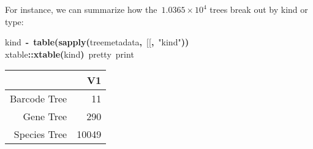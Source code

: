 \documentclass[authoryear, preprint]{elsarticle}
\makeatletter
\newcommand{\hlfunctioncall}[1]{\textcolor[rgb]{.5,0,.33}{\textbf{#1}}}%
\newcommand{\hlstring}[1]{\textcolor[rgb]{.6,.6,1}{#1}}%
\newcommand{\hlkeyword}[1]{\textbf{#1}}%
\newcommand{\hlcomment}[1]{\textcolor[rgb]{.18,.6,.34}{#1}}%
\newcommand{\hlassignement}[1]{\textbf{#1}}%
\newcommand{\hlpackage}[1]{\textcolor[rgb]{.59,.71,.145}{#1}}%
\newcommand{\hlsymbol}[1]{#1}%
\newcommand{\hlstd}[1]{\textcolor[rgb]{0,0,0}{#1}}%
\newenvironment{kframe}{%
 \def\FrameCommand##1{\hskip\@totalleftmargin \hskip-\fboxsep
 \colorbox{shadecolor}{##1}\hskip-\fboxsep
     \hskip-\linewidth \hskip-\@totalleftmargin \hskip\columnwidth}%
 \MakeFramed {\advance\hsize-\width
   \@totalleftmargin\z@ \linewidth\hsize
   \@setminipage}}%
 {\par\unskip\endMakeFramed}
\newenvironment{knitrout}{}{} %
\makeatother
\begin{document}
For instance, we can summarize how the~$1.0365\times 10^{4}$ trees break out by kind or type:
\begin{knitrout}
\color{fgcolor}\begin{kframe}
\begin{flushleft}
\ttfamily\noindent
\hlsymbol{kind}{\ }\hlassignement{\usebox{\hlnormalsizeboxlessthan}-}{\ }\hlfunctioncall{table}\hlkeyword{(}\hlfunctioncall{sapply}\hlkeyword{(}\hlsymbol{tree\usebox{\hlnormalsizeboxunderscore}metadata}\hlkeyword{,}{\ }\hlsymbol{\usebox{\hlnormalsizeboxbacktick}[[\usebox{\hlnormalsizeboxbacktick}}\hlkeyword{,}{\ }\hlstring{"{}kind"{}}\hlkeyword{)}\hlkeyword{)}\hspace*{\fill}\\
\hlstd{}\hlpackage{xtable}\hlkeyword{::}\hlfunctioncall{xtable}\hlkeyword{(}\hlsymbol{kind}\hlkeyword{)}{\ }\hlcomment{\usebox{\hlnormalsizeboxhash}pretty{\ }print}\mbox{}
\normalfont
\end{flushleft}
\end{kframe}\begin{table}[ht]
\begin{center}
\begin{tabular}{rr}
  \hline
 & V1 \\ 
  \hline
Barcode Tree &  11 \\ 
  Gene Tree & 290 \\ 
  Species Tree & 10049 \\ 
   \hline
\end{tabular}
\end{center}
\end{table}\color{fgcolor}
\end{knitrout}
\end{document}
